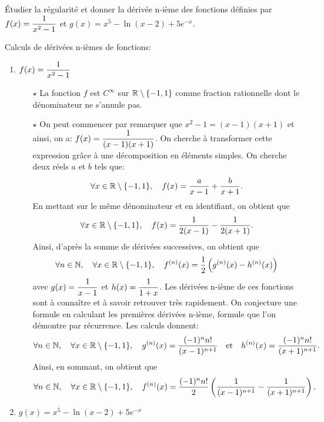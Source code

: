 \documentclass[a4paper, 11pt,reqno]{article}
\begin{document}
\begin{exercice}   \;
	\'Etudier la r\'egularit\'e et donner la d\'eriv\'ee n-i\`eme des fonctions d\'efinies par $f(x)=\displaystyle\frac{1}{x^2-1}$  et $g(x) =  x^5-\ln(x-2)+5e^{-x}$.
\end{exercice}
\begin{correction}  \;
	Calculs de d\'eriv\'ees n-i\`emes de fonctions:
	\begin{enumerate}
		\item $f(x)=\displaystyle\frac{1}{x^2-1}$
		      \begin{itemize}
			      \item[$\star$] La fonction $f$ est $C^{\infty}$ sur $\mathbb{R}\setminus\lbrace -1,1\rbrace$ comme fraction rationnelle dont le d\'enominateur ne s'annule pas.
			      \item[$\star$] On peut commencer par remarquer que $x^2-1=(x-1)(x+1)$ et ainsi, on a: $f(x)=\displaystyle\frac{1}{(x-1)(x+1)}$. On cherche \`a transformer cette expression gr\^ace \`a une d\'ecomposition en \'el\'ements simples. On cherche deux r\'eels $a$ et $b$ tels que:
			            $$\forall x\in\mathbb{R}\setminus\lbrace -1,1\rbrace,\quad f(x)=\displaystyle\frac{a}{x-1}+\displaystyle\frac{b}{x+1}.$$
			            En mettant sur le m\^eme d\'enominateur et en identifiant, on obtient que
			            $$\forall x\in\mathbb{R}\setminus\lbrace -1,1\rbrace,\quad f(x)=\displaystyle\frac{1}{2(x-1)}-\displaystyle\frac{1}{2(x+1)}.$$
			            Ainsi, d'apr\`es la somme de d\'eriv\'ees successives, on obtient que
			            $$\forall n\in\mathbb{N},\quad \forall x\in\mathbb{R}\setminus\lbrace -1,1\rbrace,\quad f^{(n)}(x)=\displaystyle\frac{1}{2}\left(g^{(n)}(x)-h^{(n)}(x)\right)$$
			            avec $g(x)=\displaystyle\frac{1}{x-1}$ et $h(x)=\displaystyle\frac{1}{1+x}$. Les d\'eriv\'ees n-i\`eme de ces fonctions sont \`a conna\^itre et \`a savoir retrouver tr\`es rapidement. On conjecture une formule en calculant les premi\`eres d\'eriv\'ees n-i\`eme, formule que l'on d\'emontre par r\'ecurrence. Les calculs donnent:
			            $$\forall n\in\mathbb{N},\quad \forall x\in\mathbb{R}\setminus\lbrace -1,1\rbrace,\quad g^{(n)}(x)=\displaystyle\frac{(-1)^n n!}{(x-1)^{n+1}}\quad \hbox{et}\quad
				            h^{(n)}(x)=\displaystyle\frac{(-1)^n n!}{(x+1)^{n+1}}.$$
			            Ainsi, en sommant, on obtient que
			            $$\forall n\in\mathbb{N},\quad \forall x\in\mathbb{R}\setminus\lbrace -1,1\rbrace,\quad f^{(n)}(x)=\displaystyle\frac{(-1)^n n!}{2}\left( \displaystyle\frac{1}{(x-1)^{n+1}}-\displaystyle\frac{1}{(x+1)^{n+1}}   \right).$$
		      \end{itemize}
		\item $g(x) =  x^5-\ln(x-2)+5e^{-x}$

\end{enumerate}
\end{correction}
\end{document}
